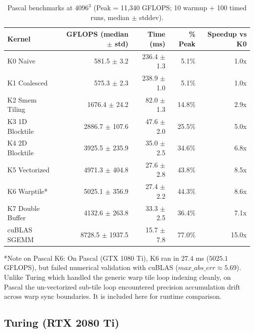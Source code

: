 \documentclass[11pt]{article}
\begin{document}
\begin{table}[h]
\centering
\begin{tabular}{|l|r|r|r|r|}
\hline
\textbf{Kernel} & \textbf{GFLOPS (median $\pm$ std)} & \textbf{Time (ms)} & \textbf{\% Peak} & \textbf{Speedup vs K0} \\
\hline
K0 Naive & 581.5 $\pm$ 3.2 & 236.4 $\pm$ 1.3 & 5.1\% & 1.0x \\
K1 Coalesced & 575.3 $\pm$ 2.3 & 238.9 $\pm$ 1.0 & 5.1\% & 1.0x \\
K2 Smem Tiling & 1676.4 $\pm$ 24.2 & 82.0 $\pm$ 1.3 & 14.8\% & 2.9x \\
K3 1D Blocktile & 2886.7 $\pm$ 107.6 & 47.6 $\pm$ 2.0 & 25.5\% & 5.0x \\
K4 2D Blocktile & 3925.5 $\pm$ 235.9 & 35.0 $\pm$ 2.5 & 34.6\% & 6.8x \\
K5 Vectorized & 4971.3 $\pm$ 404.8 & 27.6 $\pm$ 2.8 & 43.8\% & 8.5x \\
K6 Warptile* & 5025.1 $\pm$ 356.9 & 27.4 $\pm$ 2.2 & 44.3\% & 8.6x \\
K7 Double Buffer & 4132.6 $\pm$ 263.8 & 33.3 $\pm$ 2.5 & 36.4\% & 7.1x \\
cuBLAS SGEMM & 8728.5 $\pm$ 1937.5 & 15.7 $\pm$ 7.8 & 77.0\% & 15.0x \\
\hline
\end{tabular}
\caption{Pascal benchmarks at $4096^3$ (Peak = 11,340 GFLOPS; 10 warmup + 100 timed runs, median $\pm$ stddev).}
\end{table}

*Note on Pascal K6: On Pascal (GTX 1080 Ti), K6 ran in $27.4$ ms ($5025.1$ GFLOPS), but failed numerical validation with cuBLAS ($max\_abs\_err \approx 5.69$). Unlike Turing which handled the generic warp tile loop indexing cleanly, on Pascal the un-vectorized sub-tile loop encountered precision accumulation drift across warp sync boundaries. It is included here for runtime comparison.

\subsection{Turing (RTX 2080 Ti)}
\end{document}
